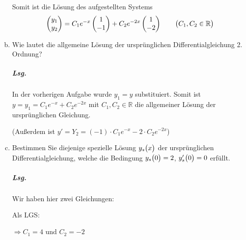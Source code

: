 \documentclass{scrreprt}
\begin{document}
\begin{enumerate}[(a)]
  Somit ist die Lösung des aufgestellten Systems
  \[
    \begin{pmatrix}
      y_1 \\
      y_2 \\
    \end{pmatrix} = C_1 e^{-x} \begin{pmatrix}
      1  \\
      -1 \\
    \end{pmatrix} + C_2 e^{-2x} \begin{pmatrix}
      1  \\
      -2 \\
    \end{pmatrix} \qquad \qty\big(C_1, C_2 \in \mathbb{R})
  \]


\item Wie lautet die allgemeine Lösung der ursprünglichen Differentialgleichung
  2. Ordnung?

  \subparagraph{Lsg.} In der vorherigen Aufgabe wurde $y_1 = y$ substituiert.
  Somit ist $y = y_1 = C_1 e^{-x} + C_2 e^{-2x}$ mit $C_1, C_2 \in \mathbb{R}$
  die allgemeiner Lösung der ursprünglichen Gleichung.

  (Außerdem ist $y' = Y_2 = (-1) \cdot C_1 e^{-x} -2 \cdot C_2 e^{-2x}$)

\newpage
\item Bestimmen Sie diejenige spezielle Lösung $y_s\qty\big(x)$ der
  ursprünglichen Differentialgleichung, welche die Bedingung $y_s\qty\big(0) = 2$,
  $y'_s\qty\big(0) = 0$ erfüllt.

  \subparagraph{Lsg.} Wir haben hier zwei Gleichungen:

  Als LGS:
   $\Rightarrow C_1 = 4$ und $C_2 = -2$


\end{enumerate}
\end{document}

